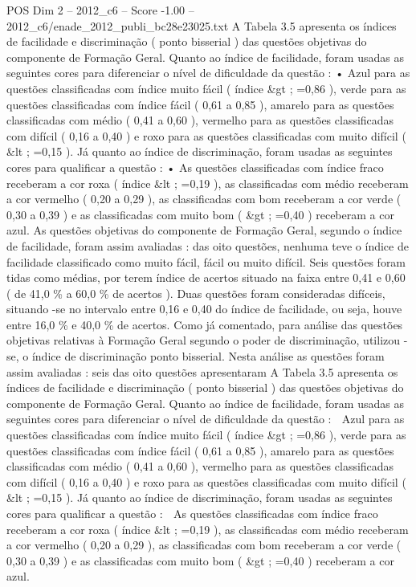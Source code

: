 \begin{textsample}{POS Dim 2 – 2012\_c6 – Score -1.00 – 2012\_c6/enade\_2012\_publi\_bc28e23025.txt}
A Tabela 3.5 apresenta os índices de facilidade e discriminação ( ponto bisserial ) das questões objetivas do componente de Formação Geral.
Quanto ao índice de facilidade, foram usadas as seguintes cores para diferenciar o nível de dificuldade da questão : • Azul para as questões classificadas com índice muito fácil ( índice \&gt ; =0,86 ), verde para as questões classificadas com índice fácil ( 0,61 a 0,85 ), amarelo para as questões classificadas com médio ( 0,41 a 0,60 ), vermelho para as questões classificadas com difícil ( 0,16 a 0,40 ) e roxo para as questões classificadas com muito difícil ( \&lt ; =0,15 ).
Já quanto ao índice de discriminação, foram usadas as seguintes cores para qualificar a questão : • As questões classificadas com índice fraco receberam a cor roxa ( índice \&lt ; =0,19 ), as classificadas com médio receberam a cor vermelho ( 0,20 a 0,29 ), as classificadas com bom receberam a cor verde ( 0,30 a 0,39 ) e as classificadas com muito bom ( \&gt ; =0,40 ) receberam a cor azul.
As questões objetivas do componente de Formação Geral, segundo o índice de facilidade, foram assim avaliadas : das oito questões, nenhuma teve o índice de facilidade classificado como muito fácil, fácil ou muito difícil.
Seis questões foram tidas como médias, por terem índice de acertos situado na faixa entre 0,41 e 0,60 ( de 41,0 \% a 60,0 \% de acertos ).
Duas questões foram consideradas difíceis, situando -se no intervalo entre 0,16 e 0,40 do índice de facilidade, ou seja, houve entre 16,0 \% e 40,0 \% de acertos.
Como já comentado, para análise das questões objetivas relativas à Formação Geral segundo o poder de discriminação, utilizou -se, o índice de discriminação ponto bisserial.
Nesta análise as questões foram assim avaliadas : seis das oito questões apresentaram A Tabela 3.5 apresenta os índices de facilidade e discriminação ( ponto bisserial ) das questões objetivas do componente de Formação Geral.
Quanto ao índice de facilidade, foram usadas as seguintes cores para diferenciar o nível de dificuldade da questão :  Azul para as questões classificadas com índice muito fácil ( índice \&gt ; =0,86 ), verde para as questões classificadas com índice fácil ( 0,61 a 0,85 ), amarelo para as questões classificadas com médio ( 0,41 a 0,60 ), vermelho para as questões classificadas com difícil ( 0,16 a 0,40 ) e roxo para as questões classificadas com muito difícil ( \&lt ; =0,15 ).
Já quanto ao índice de discriminação, foram usadas as seguintes cores para qualificar a questão :  As questões classificadas com índice fraco receberam a cor roxa ( índice \&lt ; =0,19 ), as classificadas com médio receberam a cor vermelho ( 0,20 a 0,29 ), as classificadas com bom receberam a cor verde ( 0,30 a 0,39 ) e as classificadas com muito bom ( \&gt ; =0,40 ) receberam a cor azul.

\end{textsample}
